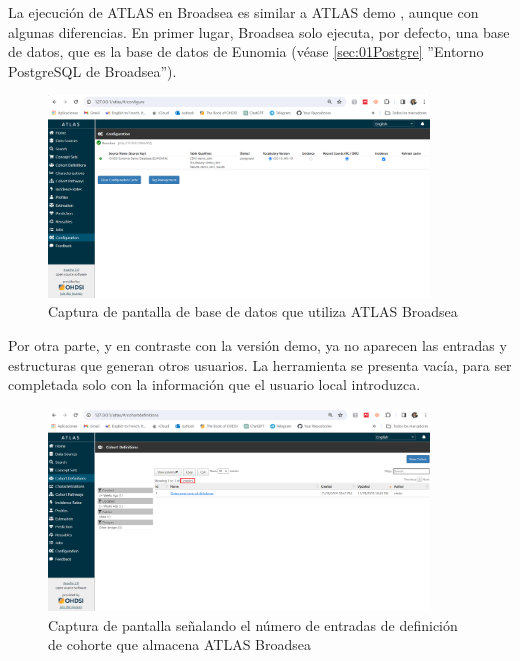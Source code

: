 
    La ejecución de ATLAS en Broadsea es similar a ATLAS demo \parencite{atlasDEMO}, aunque con algunas diferencias. En primer lugar, Broadsea solo ejecuta, por defecto, una base de datos, que es la base de datos de Eunomia (véase \ref{sec:01Postgre} ''Entorno PostgreSQL de Broadsea'').

\begin{figure}[H]
    \centering
    \includegraphics[width=0.90\textwidth]{figures/atlasBroadseaDB.png}
     \caption{Captura de pantalla de base de datos que utiliza ATLAS Broadsea}
    \label{fig:atlasBroadseaDB}
\end{figure}

    Por otra parte, y en contraste con la versión demo, ya no aparecen las entradas y estructuras que generan otros usuarios. La herramienta se presenta vacía, para ser completada solo con la información que el usuario local introduzca.

\begin{figure}[H]
    \centering
    \includegraphics[width=0.90\textwidth]{figures/atlasBroadseaCD.png}
     \caption{Captura de pantalla señalando el número de entradas de definición de cohorte que almacena ATLAS Broadsea}
    \label{fig:atlasBroadseaCD}
\end{figure}
    

